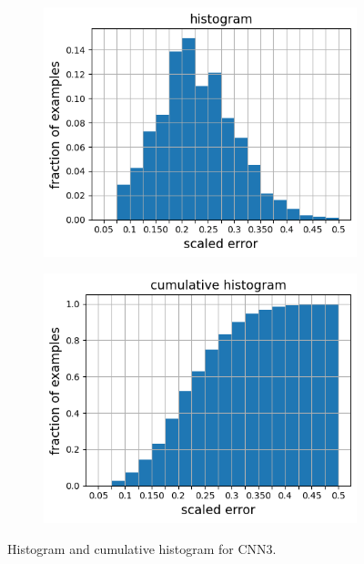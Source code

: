 \documentclass[10pt]{article}
\newcommand{\nhghalfwidth}{0.48\linewidth}
\newcommand{\nhgtotalheight}{4cm}
\begin{document}
\begin{figure}[!h]
\captionsetup[subfigure]{justification=centering}
  \centering
  \begin{subfigure}[c]{\nhghalfwidth}
    \centering
    \includegraphics[totalheight=\nhgtotalheight]{Figures/Results3/histogram.png}
  \end{subfigure}
%  
  \begin{subfigure}[c]{\nhghalfwidth}
      \centering
    \includegraphics[totalheight=\nhgtotalheight]{Figures/Results3/cumulative.png}
  \end{subfigure}
  \caption{\label{fig:cnn3histo} Histogram and cumulative histogram for CNN3.}
\end{figure}
%
\end{document}
